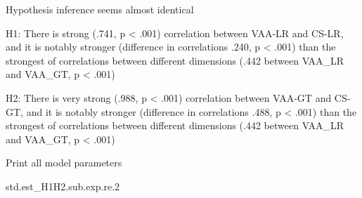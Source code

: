 \documentclass[
]{article}
\newenvironment{Shaded}{\begin{snugshade}}{\end{snugshade}}
\newcommand{\FloatTok}[1]{\textcolor[rgb]{0.00,0.00,0.81}{#1}}
\newcommand{\NormalTok}[1]{#1}
\begin{document}
Hypothesis inference seems almost identical

H1: There is strong (.741, p \textless{} .001) correlation between
VAA-LR and CS-LR, and it is notably stronger (difference in correlations
.240, p \textless{} .001) than the strongest of correlations between
different dimensions (.442 between VAA\_LR and VAA\_GT, p \textless{}
.001)

H2: There is very strong (.988, p \textless{} .001) correlation between
VAA-GT and CS-GT, and it is notably stronger (difference in correlations
.488, p \textless{} .001) than the strongest of correlations between
different dimensions (.442 between VAA\_LR and VAA\_GT, p \textless{}
.001)

Print all model parameters

\begin{Shaded}
\begin{Highlighting}[]
\NormalTok{std.est_H1H2.sub.exp.re}\FloatTok{.2}
\end{Highlighting}
\end{Shaded}
\end{document}
